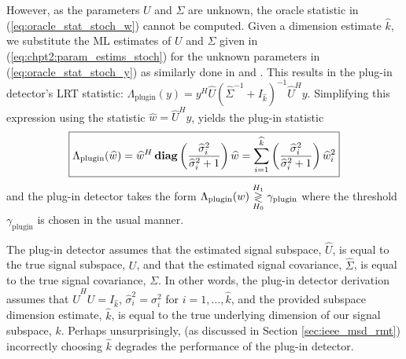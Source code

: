 However, as the parameters $U$ and $\Sigma$ are unknown, the oracle statistic in
(\ref{eq:oracle_stat_stoch_w}) cannot be computed. Given a dimension estimate
$\widehat{k}$, we substitute the ML estimates of $U$ and $\Sigma$ given in
(\ref{eq:chpt2:param_estims_stoch}) for the unknown parameters in (\ref{eq:oracle_stat_stoch_y})
as similarly done in \cite{mcwhorter2003matched} and \cite{jin2005cfar}. This results in the plug-in detector's LRT statistic: $
\Lambda_{\text{plugin}}(y)= y^H\widehat{U}\left(\widehat{\Sigma}^{-1}+I_{\widehat{k}}\right)^{-1}\widehat{U}^Hy$. Simplifying this expression using the statistic $\widehat{w} = \widehat{U}^Hy$, yields the plug-in statistic
\begin{equation}\label{eq:plugin_stat_stoch}
\boxed{\Lambda_{\text{plugin}}(\widehat{w}) = \widehat{w}^H\diag\left(\frac{\widehat{\sigma}^2_i}{\widehat{\sigma}^2_i+1}\right)\widehat{w}=\sum_{i=1}^{\widehat{k}}\left(\frac{\widehat{\sigma}_i^2}{\widehat{\sigma}_i^2+1}\right)\widehat{w}_i^2}
\end{equation}
and the plug-in detector takes the form $\Lambda_{\text{plugin}}(w) \overset{H_1}{\underset{H_0}{\gtrless}} \gamma_{\text{plugin}}$
where the threshold $\gamma_{\text{plugin}}$ is chosen in the usual manner.

The plug-in detector assumes that the estimated signal subspace, $\widehat{U}$, is equal to the true signal subspace, $U$, and that the estimated signal covariance, $\widehat{\Sigma}$, is equal to the true signal covariance, $\Sigma$. In other words,  the plug-in detector derivation assumes that $\widehat{U}^HU=I_{\widehat{k}}$, $\widehat{\sigma}_i^2=\sigma_i^2$ for $i=1,\dots,\widehat{k}$, and the provided subspace dimension estimate, $\widehat{k}$, is equal to the true underlying dimension of our signal subspace, $k$. Perhaps unsurprisingly, (as discussed in Section \ref{sec:ieee_msd_rmt}) incorrectly choosing $\widehat{k}$ degrades the performance of the plug-in detector.

